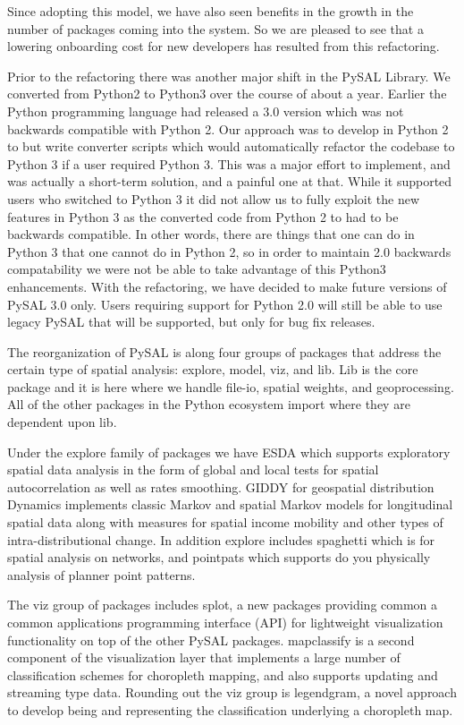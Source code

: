 \documentclass[11pt]{article}
\begin{document}
Since adopting this model, we have also seen benefits in the growth in the number
of packages coming into the system. So we are pleased to see that a lowering
onboarding cost for new developers has resulted from this refactoring.


Prior to the refactoring there was another major shift in the PySAL Library. We
converted from Python2 to Python3 over the course of about a year. Earlier the
Python programming language had released a 3.0 version which was not backwards
compatible with Python 2. Our approach was to develop in Python 2 to but write
converter scripts which would automatically refactor the codebase to Python 3
if a user required Python 3. This was a major effort to implement, and was
actually a short-term solution, and a painful one at that. While it supported
users who switched to Python 3 it did not allow us to fully exploit the new
features in Python 3 as the converted code from Python 2 to had to be backwards
compatible. In other words, there are things that one can do in Python 3 that
one cannot do in Python 2, so in order to maintain 2.0 backwards compatability
we were not be able to take advantage of this Python3 enhancements. With the
refactoring, we have decided to make future versions of PySAL 3.0 only. Users
requiring support for Python 2.0 will still be able to use legacy PySAL that
will be supported, but only for bug fix releases.


The reorganization of PySAL is along four groups of packages that address the
certain type of spatial analysis: explore, model, viz, and lib. Lib is the core
package and it is here where we handle file-io, spatial weights, and
geoprocessing. All of the other packages in the Python ecosystem import where they
are dependent upon lib.

Under the explore family of packages we have ESDA which supports exploratory
spatial data analysis in the form of global and local tests for spatial
autocorrelation as well as rates smoothing. GIDDY for geospatial distribution
Dynamics implements classic Markov and spatial Markov models for longitudinal
spatial data along with measures for spatial income mobility and other types of
intra-distributional change. In addition explore includes spaghetti which is
for spatial analysis on networks, and pointpats which supports do you
physically analysis of planner point patterns.

The viz group of packages includes splot, a new packages providing common a
common applications programming interface (API) for lightweight visualization
functionality on top of the other PySAL packages. mapclassify is a second
component of the visualization layer that implements a large number of
classification schemes for choropleth mapping, and also supports updating and
streaming type data. Rounding out the viz group is legendgram, a novel approach
to develop being and representing the classification underlying a choropleth
map.
\end{document}
